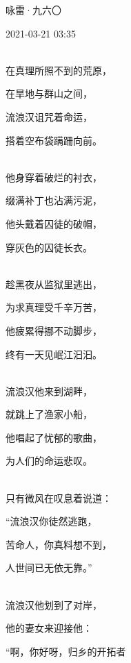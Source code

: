 \documentclass[UTF8,12pt,oneside]{ctexbook}
\begin{document}
    \begin{center}
        \large\kaishu
        咏雷·九六〇
        \normalsize\songti
        
        2021-03-21 03:35
        
        ~\\
        
        \fangsong
        在真理所照不到的荒原，
        
        在旱地与群山之间，
        
        流浪汉诅咒着命运，
        
        搭着空布袋蹒跚向前。
        
        ~\\
        
        他身穿着破烂的衬衣，
        
        缀满补丁也沾满污泥，
        
        他头戴着囚徒的破帽，
        
        穿灰色的囚徒长衣。
        
        ~\\
        
        趁黑夜从监狱里逃出，
        
        为求真理受千辛万苦，
        
        他疲累得挪不动脚步，
        
        终有一天见岷江汩汩。
        
        ~\\
        
        流浪汉他来到湖畔，
        
        就跳上了渔家小船，
        
        他唱起了忧郁的歌曲，
        
        为人们的命运悲叹。
        
        ~\\
        
        只有微风在叹息着说道：
        
        “流浪汉你徒然逃跑，
        
        苦命人，你真料想不到，
        
        人世间已无依无靠。”
        
        ~\\
        
        流浪汉他划到了对岸，
        
        他的妻女来迎接他：
        
        “啊，你好呀，归乡的开拓者
        

\end{center}
\end{document}
